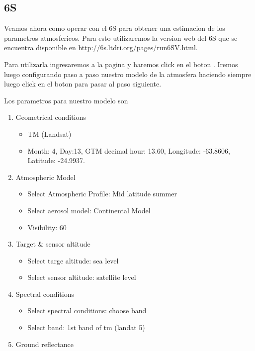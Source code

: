 \subsection{6S}
\label{sub:corr:6S}

Veamos ahora como operar con el 6S para obtener una estimacion de los parametros
atmosfericos. Para esto utilizaremos la version web del 6S que se encuentra
disponible en http://6s.ltdri.org/pages/run6SV.html.

Para utilizarla ingresaremos a la pagina y haremos click en el boton
. Iremos luego configurando paso a paso nuestro modelo de la
atmosfera haciendo siempre luego click en el boton  para
pasar al paso siguiente.

Los parametros para nuestro modelo son

\begin{enumerate}
    \item Geometrical conditions
        \begin{itemize}
            \item TM (Landsat)
            \item Month: 4, Day:13, GTM decimal hour: 13.60, Longitude:
                -63.8606, Latitude: -24.9937.
        \end{itemize}
    \item Atmospheric Model
        \begin{itemize}
            \item Select Atmospheric Profile: Mid latitude summer
            \item Select aerosol model: Continental Model
            \item Visibility: 60
        \end{itemize}
    \item Target \& sensor altitude
        \begin{itemize}
            \item Select targe altitude: sea level
            \item Select sensor altitude: satellite level
        \end{itemize}
    \item Spectral conditions
        \begin{itemize}
            \item Select spectral conditions: choose band
            \item Select band: 1st band of tm (landat 5)
        \end{itemize}
    \item Ground reflectance

\end{enumerate}
